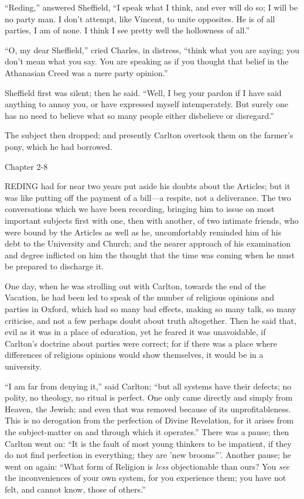 ``Reding,'' answered Sheffield, ``I speak what I think,
and ever will do so; I will be no party man. I don't attempt, like
Vincent, to unite opposites. He is of all parties, I am of none. I
think I see pretty well the hollowness of all.''

``O, my dear Sheffield,'' cried Charles, in distress,
``think what you are saying; you don't mean what you say. You are
speaking as if you thought that belief in the Athanasian Creed was a
mere party opinion.''

Sheffield first was silent; then he said. ``Well, I beg your pardon if I have said anything to annoy you, or have expressed
myself intemperately. But surely one has no need to believe what so
many people either disbelieve or disregard.''

The subject then dropped; and presently Carlton overtook them on
the farmer's pony, which he had borrowed.

Chapter 2-8


REDING had for near two years put aside
his doubts about the Articles; but it was like putting off the payment
of a bill—a respite, not a deliverance. The two conversations which
we have been recording, bringing him to issue on most important
subjects first with one, then with another, of two intimate friends,
who were bound by the Articles as well as he, uncomfortably reminded
him of his debt to the University and Church; and the nearer approach
of his examination and degree inflicted on him the thought that the
time was coming when he must be prepared to discharge it.

One day, when he was strolling out with Carlton, towards the end of
the Vacation, he had been led to speak of the number of religious
opinions and parties in Oxford, which had so many bad effects, making
so many talk, so many criticise, and not a few perhaps doubt about
truth altogether. Then he said that, evil as it was in a place of
education, yet he feared it was unavoidable, if Carlton's doctrine
about parties were correct; for if there was a place where differences
of religious opinions would show themselves, it would be in a
university.

``I am far from denying it,'' said Carlton; ``but all
systems have their defects; no polity, no theology, no ritual is
perfect. One only came directly and simply from Heaven, the Jewish;
and even that was removed because of its unprofitableness. This is no
derogation from the perfection of Divine Revelation, for it arises
from the subject-matter on and through which it operates.'' There
was a pause; then Carlton went on: ``It is the fault of most young
thinkers to be impatient, if they do not find perfection in
everything; they are 'new brooms'''. Another pause; he went on
again: ``What form of Religion is \emph{less} objectionable than
ours? You \emph{see} the inconveniences of your own system, for you
experience them; you have not felt, and cannot know, those of
others.''

